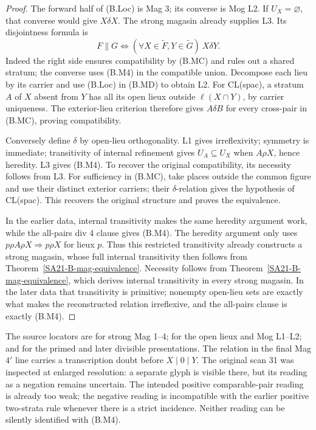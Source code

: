 \begin{proof}
The forward half of (B.Loc) is Mag 3; its converse is Mog L2.
If \(U_X=\varnothing\), that converse would give \(X\delta X\).
The strong magasin already supplies L3. Its disjointness formula is
\[
 F\parallel G\Longleftrightarrow
       (\forall X\in\widetilde F,Y\in\widetilde G)\ X\delta Y.
                                                        \tag{B.MD}
\]
Indeed the right side ensures compatibility by (B.MC) and rules out
a shared stratum; the converse uses (B.M4) in the compatible union.
Decompose each lieu by its carrier and use (B.Loc) in (B.MD) to obtain
L2. For CL(spac), a stratum \(A\) of \(X\) absent from \(Y\) has
all its open lieux outside \(\ell(X\cap Y)\), by carrier uniqueness.
The exterior-lieu criterion therefore gives \(A\delta B\) for every
cross-pair in (B.MC), proving compatibility.

Conversely define \(\delta\) by open-lieu orthogonality. L1 gives
irreflexivity; symmetry is immediate; transitivity of internal
refinement gives \(U_A\subseteq U_X\) when \(A\rho X\), hence
heredity. L3 gives (B.M4). To recover the original compatibility,
its necessity follows from L3. For sufficiency in (B.MC), take
places outside the common figure and use their distinct exterior
carriers; their \(\delta\)-relation gives the hypothesis of CL(spac).
This recovers the original structure and proves the equivalence.

In the earlier data, internal transitivity makes the same heredity
argument work, while the all-pairs div 4 clause gives (B.M4).
The heredity argument only uses \(p\rho A\rho X\Rightarrow p\rho X\)
for lieux \(p\). Thus this restricted transitivity already constructs
a strong magasin, whose full internal transitivity then follows from
Theorem~\ref{SA21-B-mag-equivalence}.
Necessity follows from Theorem~\ref{SA21-B-mag-equivalence}, which
derives internal transitivity in every strong magasin. In the later
data that transitivity is primitive; nonempty open-lieu sets are
exactly what makes the reconstructed relation irreflexive, and
the all-pairs clause is exactly (B.M4).
\end{proof}

The source locators are
 for strong Mag 1--4;
 for the open
lieux and Mog L1--L2; and
 for the primed
and later divisible presentations. The relation in the final
Mag \(4'\) line carries a transcription doubt before \(X\mid0\mid Y\).
The original scan 31 was inspected at enlarged resolution: a separate
glyph is visible there, but its reading as a negation remains uncertain.
The intended positive comparable-pair reading is already too weak;
the negative reading is incompatible with the earlier positive
two-strata rule whenever there is a strict incidence. Neither reading
can be silently identified with (B.M4).

